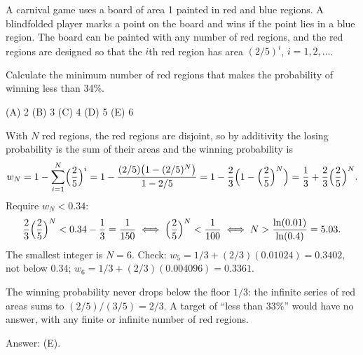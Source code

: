\begin{example}
A carnival game uses a board of area 1 painted in red and blue regions. A
blindfolded player marks a point on the board and wins if the point lies in a blue
region. The board can be painted with any number of red regions, and the red regions
are designed so that the $i$th red region has area $(2/5)^i$, $i = 1, 2, \ldots$.

Calculate the minimum number of red regions that makes the probability of winning
less than 34\%.

(A) 2 \qquad (B) 3 \qquad (C) 4 \qquad (D) 5 \qquad (E) 6
\end{example}
\begin{solution}
With $N$ red regions, the red regions are disjoint, so by additivity the losing
probability is the sum of their areas and the winning probability is
\[
  w_N = 1 - \sum_{i=1}^{N} \Bigl(\frac{2}{5}\Bigr)^i
      = 1 - \frac{(2/5)\bigl(1 - (2/5)^N\bigr)}{1 - 2/5}
      = 1 - \frac{2}{3}\Bigl(1 - \Bigl(\frac{2}{5}\Bigr)^N\Bigr)
      = \frac{1}{3} + \frac{2}{3}\Bigl(\frac{2}{5}\Bigr)^N .
\]
Require $w_N < 0.34$:
\[
  \frac{2}{3}\Bigl(\frac{2}{5}\Bigr)^N < 0.34 - \frac{1}{3} = \frac{1}{150}
  \iff \Bigl(\frac{2}{5}\Bigr)^N < \frac{1}{100}
  \iff N > \frac{\ln(0.01)}{\ln(0.4)} = 5.03 .
\]
The smallest integer is $N = 6$. Check: $w_5 = 1/3 + (2/3)(0.01024) = 0.3402$, not
below $0.34$; $w_6 = 1/3 + (2/3)(0.004096) = 0.3361$.

The winning probability never drops below the floor $1/3$: the infinite series of red
areas sums to $(2/5)/(3/5) = 2/3$. A target of ``less than 33\%'' would have no
answer, with any finite or infinite number of red regions.

Answer: (E).
\end{solution}

